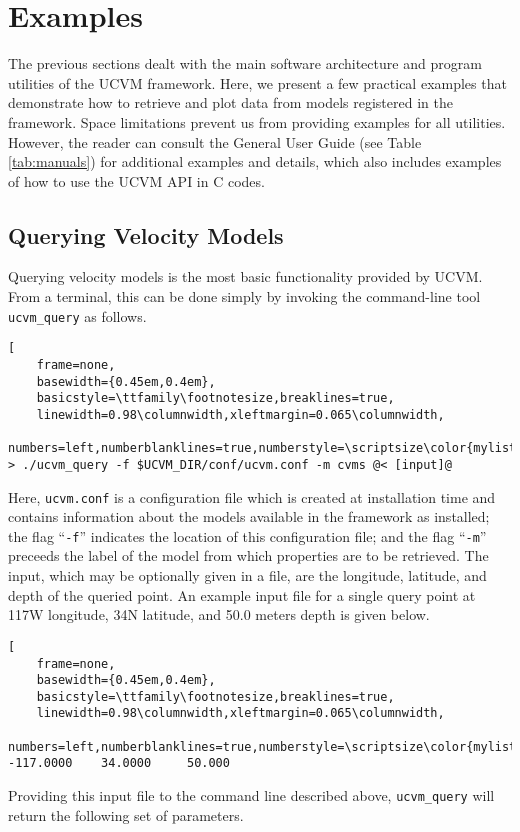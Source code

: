 
\section{Examples}

The previous sections dealt with the main software architecture and program utilities of the UCVM framework. Here, we present a few practical examples that demonstrate how to retrieve and plot data from models registered in the framework. Space limitations prevent us from providing examples for all utilities. However, the reader can consult the General User Guide (see Table \ref{tab:manuals}) for additional examples and details, which also includes examples of how to use the UCVM API in C codes.

\subsection{Querying Velocity Models}

Querying velocity models is the most basic functionality provided by UCVM. From a terminal, this can be done simply by invoking the command-line tool \texttt{ucvm\_query} as follows.

\begin{lstlisting}[
	frame=none,
	basewidth={0.45em,0.4em},
	basicstyle=\ttfamily\footnotesize,breaklines=true,
	linewidth=0.98\columnwidth,xleftmargin=0.065\columnwidth,
	numbers=left,numberblanklines=true,numberstyle=\scriptsize\color{mylistingnclr},style=optional]
> ./ucvm_query -f $UCVM_DIR/conf/ucvm.conf -m cvms @< [input]@
\end{lstlisting}

\noindent
Here, \texttt{ucvm.conf} is a configuration file which is created at installation time and contains information about the models available in the framework as installed; the flag ``\texttt{-f}'' indicates the location of this configuration file; and the flag ``\texttt{-m}'' preceeds the label of the model from which properties are to be retrieved. The input, which may be optionally given in a file, are the longitude, latitude, and depth of the queried point. An example input file for a single query point at 117W longitude, 34N latitude, and 50.0 meters depth is given below.

\begin{lstlisting}[
	frame=none,
	basewidth={0.45em,0.4em},
	basicstyle=\ttfamily\footnotesize,breaklines=true,
	linewidth=0.98\columnwidth,xleftmargin=0.065\columnwidth,
	numbers=left,numberblanklines=true,numberstyle=\scriptsize\color{mylistingnclr}]
-117.0000    34.0000     50.000
\end{lstlisting}
Providing this input file to the command line described above, \texttt{ucvm\_query} will return the following set of parameters.

